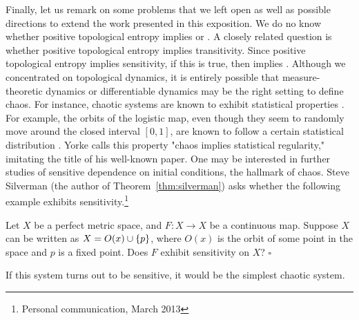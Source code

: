 \documentclass[10pt,twoside,draft]{book}
\begin{document}
Finally, let us remark on some problems that we left open as well as possible directions to extend the work presented in this exposition.
We do no know whether positive topological entropy implies \wig or \blcp.
A closely related question is whether positive topological entropy implies transitivity. 
Since positive topological entropy implies sensitivity, if this is true, then \akm implies \wig.
Although we concentrated on topological dynamics, it is entirely possible that measure-theoretic dynamics or differentiable dynamics may be the right setting to define chaos.
For instance, chaotic systems are known to exhibit statistical properties \citep{lasota}.
For example, the orbits of the logistic map, even though they seem to randomly move around the closed interval $[0,1]$, are known to follow a certain statistical distribution \citep{sternberg}.
Yorke calls this property "chaos implies statistical regularity," imitating the title of his well-known paper. \citep{ueda-abraham}
One may be interested in further studies of sensitive dependence on initial conditions, the hallmark of chaos.
Steve Silverman (the author of Theorem~\ref{thm:silverman}) asks whether the following example exhibits sensitivity.\footnote{Personal communication, March 2013}
\begin{example}
  Let $X$ be a perfect metric space, and $F: X \to X$ be a continuous map.
  Suppose $X$ can be written as $X = O(x) \cup \left \{ p \right \}$, where $O(x)$ is the orbit of some point in the space and $p$ is a fixed point.
  Does $F$ exhibit sensitivity on $X$?
  $\square$
\end{example}
If this system turns out to be sensitive, it would be the simplest chaotic system.



\end{document}
